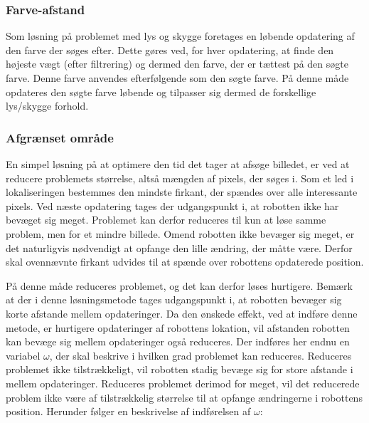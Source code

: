 \subsubsection{Farve-afstand}
Som løsning på problemet med lys og skygge foretages en løbende opdatering af den farve der søges efter.
Dette gøres ved, for hver opdatering, at finde den højeste vægt (efter filtrering) og dermed den farve, der er tættest på den søgte farve.
Denne farve anvendes efterfølgende som den søgte farve.
På denne måde opdateres den søgte farve løbende og tilpasser sig dermed de forskellige lys/skygge forhold.

\subsubsection{Afgrænset område}
En simpel løsning på at optimere den tid det tager at afsøge billedet, er ved at reducere problemets størrelse, altså mængden af pixels, der søges i.
Som et led i lokaliseringen bestemmes den mindste firkant, der spændes over alle interessante pixels.
Ved næste opdatering tages der udgangspunkt i, at robotten ikke har bevæget sig meget.
Problemet kan derfor reduceres til kun at løse samme problem, men for et mindre billede.
Omend robotten ikke bevæger sig meget, er det naturligvis nødvendigt at opfange den lille ændring, der måtte være.
Derfor skal ovennævnte firkant udvides til at spænde over robottens opdaterede position.

På denne måde reduceres problemet, og det kan derfor løses hurtigere.
Bemærk at der i denne løsningsmetode tages udgangspunkt i, at robotten bevæger sig korte afstande mellem opdateringer.
Da den ønskede effekt, ved at indføre denne metode, er hurtigere opdateringer af robottens lokation, vil afstanden robotten kan bevæge sig mellem opdateringer også reduceres.
Der indføres her endnu en variabel $\omega$, der skal beskrive i hvilken grad problemet kan reduceres.
Reduceres problemet ikke tilstrækkeligt, vil robotten stadig bevæge sig for store afstande i mellem opdateringer.
Reduceres problemet derimod for meget, vil det reducerede problem ikke være af tilstrækkelig størrelse til at opfange ændringerne i robottens position.
Herunder følger en beskrivelse af indførelsen af $\omega$:

